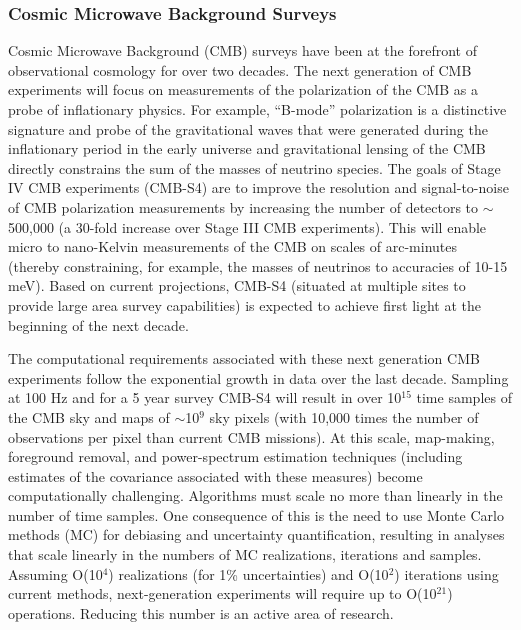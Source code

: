 \subsubsection{Cosmic Microwave Background
      Surveys}

Cosmic Microwave Background (CMB) surveys have been at the forefront
of observational cosmology for over two decades. The next generation
of CMB experiments will focus on measurements of the polarization of
the CMB as a probe of inflationary physics. For example, ``B-mode''
polarization is a distinctive signature and probe of the gravitational
waves that were generated during the inflationary period in the early
universe and gravitational lensing of the CMB directly constrains the
sum of the masses of neutrino species. The goals of Stage IV CMB
experiments (CMB-S4) are to improve the resolution and
signal-to-noise of CMB polarization measurements by increasing the
number of detectors to $\sim$500,000 (a 30-fold increase over Stage
III CMB experiments). This will enable micro to nano-Kelvin
measurements of the CMB on scales of arc-minutes (thereby
constraining, for example, the masses of neutrinos to accuracies of
10-15 meV). Based on current projections, CMB-S4 (situated at multiple
sites to provide large area survey capabilities) is expected to
achieve first light at the beginning of the next decade.

The computational requirements associated with these next generation
CMB experiments follow the exponential growth in data over the last
decade.  Sampling at 100 Hz and for a 5 year survey CMB-S4 will result
in over 10$^{15}$ time samples of the CMB sky and maps of
$\sim$10$^{9}$ sky pixels (with 10,000 times the number of
observations per pixel than current CMB missions). At this scale,
map-making, foreground removal, and power-spectrum estimation
techniques (including estimates of the covariance associated with
these measures) become computationally challenging. Algorithms must
scale no more than linearly in the number of time samples. One
consequence of this is the need to use Monte Carlo methods (MC) for
debiasing and uncertainty quantification, resulting in analyses that
scale linearly in the numbers of MC realizations, iterations and
samples. Assuming O(10$^4$) realizations (for 1\% uncertainties) and
O(10$^2$) iterations using current methods, next-generation
experiments will require up to O(10$^{21}$) operations. Reducing this
number is an active area of research.


